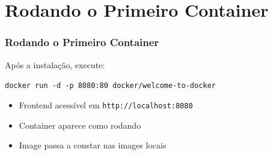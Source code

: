 \section{Rodando o Primeiro Container}

\begin{frame}
  \frametitle{Rodando o Primeiro Container}
  Após a instalação, execute:

  \vspace{0.5em}
  \texttt{docker run -d -p 8080:80 docker/welcome-to-docker}

  \vspace{0.5em}
  \begin{itemize}
    \item Frontend acessível em \texttt{http://localhost:8080}
    \item Container aparece como rodando
    \item Image passa a constar nas images locais
  \end{itemize}
\end{frame}
